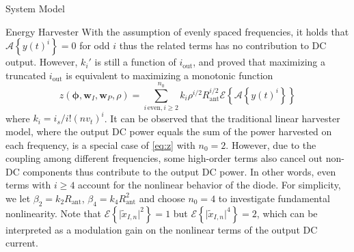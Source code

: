 \documentclass[journal]{IEEEtran}
\begin{document}
\begin{section}{System Model}
\begin{subsection}{Energy Harvester}
			With the assumption of evenly spaced frequencies, it holds that $\mathcal{A}\left\{y(t)^i\right\}=0$ for odd $i$ thus the related terms has no contribution to DC output. However, $k_i'$ is still a function of $i_{\text{out}}$, and \cite{Clerckx2016a} proved that maximizing a truncated $i_{\text{out}}$ is equivalent to maximizing a monotonic function
			\begin{equation}\label{eq:z}
				z(\boldsymbol{\phi},\boldsymbol{w}_I,\boldsymbol{w}_P,\rho)=\sum_{i\,\text{even},i\ge2}^{n_0}{k_i}{\rho^{i/2}}{R_{\text{ant}}^{i/2}}{\mathcal{E}\left\{\mathcal{A}\left\{y(t)^i\right\}\right\}}
			\end{equation}
			where $k_i=i_s/i!(nv_t)^i$. It can be observed that the traditional linear harvester model, where the output DC power equals the sum of the power harvested on each frequency, is a special case of \ref{eq:z} with $n_0=2$. However, due to the coupling among different frequencies, some high-order terms also cancel out non-DC components thus contribute to the output DC power. In other words, even terms with $i \ge 4$ account for the nonlinear behavior of the diode. For simplicity, we let $\beta_2={k_2}{R_{\text{ant}}}$, $\beta_4={k_4}{R_{\text{ant}}^2}$ and choose $n_0=4$ to investigate fundamental nonlinearity. Note that $\mathcal{E}\left\{\lvert\tilde{x}_{I,n}\rvert^2\right\}=1$ but $\mathcal{E}\left\{\lvert\tilde{x}_{I,n}\rvert^4\right\}=2$, which can be interpreted as a modulation gain on the nonlinear terms of the output DC current.


\end{subsection}
\end{section}
\end{document}
